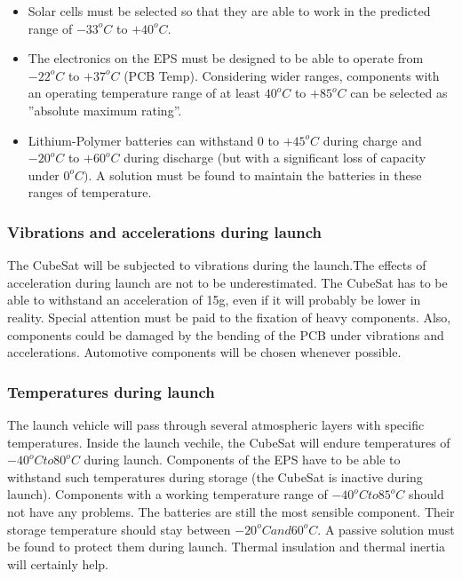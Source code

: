 \begin{itemize}
\item Solar cells must be selected so that they are able to work in the predicted range of $-33^{o}C$ to $+40^{o}C$.
\item The electronics on the EPS must be designed to be able to operate from $-22^{o}C$ to $+37^{o}C$ (PCB Temp). Considering wider ranges, components with an operating temperature range of at least  $40^{o}C$ to $+85^{o}C$ can be selected as ”absolute maximum rating”.
\item Lithium-Polymer batteries can withstand 0 to $+45^{o}C$ during charge and $-20^{o}C$ to $+60^{o}C$ during discharge (but with a significant loss of capacity under $0^{o}C)$. A solution must be found to maintain the batteries in these ranges of temperature.
\end{itemize}

\subsubsection{Vibrations and accelerations during launch} 

The CubeSat will be subjected to vibrations during the launch.The effects of acceleration during launch are not to be underestimated. The CubeSat has to be able to withstand an acceleration of 15g, even if it will probably be lower in reality. Special attention must be paid to the fixation of heavy components. Also, components could be damaged by the bending of the PCB under vibrations and accelerations. Automotive components will be chosen whenever possible.

\subsubsection{Temperatures during launch} 

The launch vehicle will pass through several atmospheric layers with specific temperatures. Inside the launch vechile, the CubeSat will endure temperatures of $-40^{o}C to 80^{o}C$ during launch. Components of the EPS have to be able to withstand such temperatures during storage (the CubeSat is inactive during launch). Components with a working temperature range of $-40^{o}C to 85^{o}C$ should not have any problems.
The batteries are still the most sensible component. Their storage temperature should stay between $-20^{o}C and 60^{o}C$. A passive solution must be found to protect them during launch. Thermal insulation and thermal inertia will certainly help.




